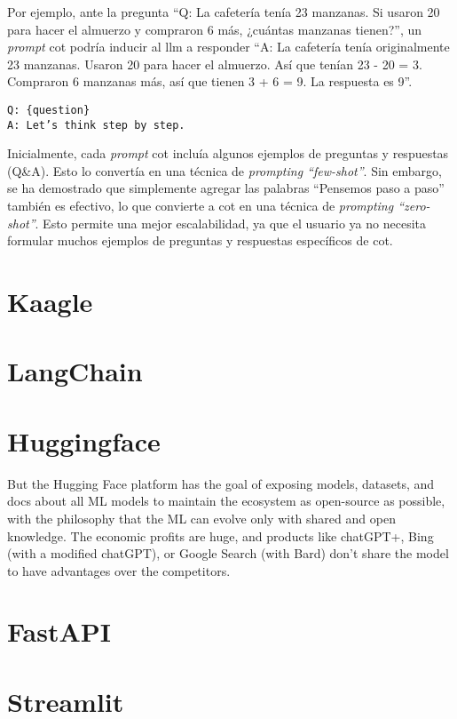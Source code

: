 Por ejemplo, ante la pregunta ``Q: La cafetería tenía 23 manzanas. Si usaron 20 para hacer el almuerzo y compraron 6 más, ¿cuántas manzanas tienen?'', un \textit{prompt} \acrshort{cot} podría inducir al \acrshort{llm} a responder ``A: La cafetería tenía originalmente 23 manzanas. Usaron 20 para hacer el almuerzo. Así que tenían 23 - 20 = 3. Compraron 6 manzanas más, así que tienen 3 + 6 = 9. La respuesta es 9''\cite{wei2023chainofthought}.

\begin{verbatim}
Q: {question}
A: Let’s think step by step.
\end{verbatim}

Inicialmente, cada \textit{prompt} \acrshort{cot} incluía algunos ejemplos de preguntas y respuestas (Q\&A). Esto lo convertía en una técnica de \textit{prompting ``few-shot''}. Sin embargo, se ha demostrado que simplemente agregar las palabras ``Pensemos paso a paso'' también es efectivo, lo que convierte a \acrshort{cot} en una técnica de \textit{prompting ``zero-shot''}. Esto permite una mejor escalabilidad, ya que el usuario ya no necesita formular muchos ejemplos de preguntas y respuestas específicos de \acrshort{cot}.

\section{Kaagle}

\section{LangChain}

\section{Huggingface}

But the Hugging Face platform has the goal of exposing models, datasets, and docs about all ML models to maintain the ecosystem as open-source as possible, with the philosophy that the ML can evolve only with shared and open knowledge. The economic profits are huge, and products like chatGPT+, Bing (with a modified chatGPT), or Google Search (with Bard) don’t share the model to have advantages over the competitors.

\section{FastAPI}

\section{Streamlit}
